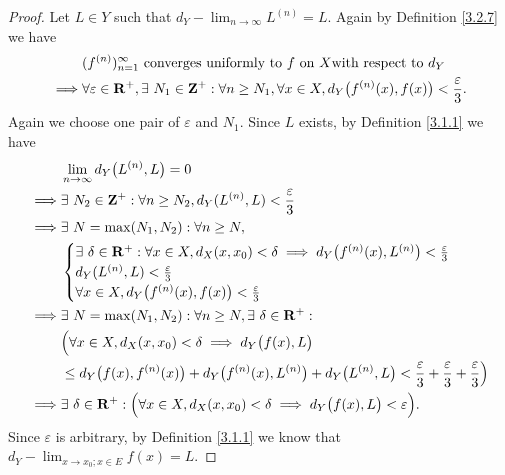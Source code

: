 \begin{proof}
    Let \(L \in Y\) such that \(d_Y - \lim_{n \to \infty} L^{(n)} = L\).
    Again by Definition \ref{3.2.7} we have
    \begin{align*}
                 & (f^{(n)})_{n = 1}^\infty \text{ converges uniformly to } f \text{ on } X \text{with respect to } d_Y                                              \\
        \implies & \forall \varepsilon \in \mathbf{R}^+, \exists\ N_1 \in \mathbf{Z}^+ : \forall n \geq N_1, \forall x \in X, d_Y\big(f^{(n)}(x), f(x)\big) < \frac{\varepsilon}{3}.
    \end{align*}
    Again we choose one pair of \(\varepsilon\) and \(N_1\).
    Since \(L\) exists, by Definition \ref{3.1.1} we have
    \begin{align*}
                 & \lim_{n \to \infty} d_Y\big(L^{(n)}, L\big) = 0                                                                                                                              \\
        \implies & \exists\ N_2 \in \mathbf{Z}^+ : \forall n \geq N_2, d_Y(L^{(n)}, L) < \frac{\varepsilon}{3}                                                                                          \\
        \implies & \exists\ N = \max(N_1, N_2) : \forall n \geq N,                                                                                                                              \\
                 & \begin{cases}
                       \exists\ \delta \in \mathbf{R}^+ : \forall x \in X, d_X(x, x_0) < \delta \implies d_Y\big(f^{(n)}(x), L^{(n)}\big) < \frac{\varepsilon}{3} \\
                       d_Y(L^{(n)}, L) < \frac{\varepsilon}{3}                                                                                            \\
                       \forall x \in X, d_Y\big(f^{(n)}(x), f(x)\big) < \frac{\varepsilon}{3}
                   \end{cases}                                           \\
        \implies & \exists\ N = \max(N_1, N_2) : \forall n \geq N, \exists\ \delta \in \mathbf{R}^+ :                                                                                                   \\
                 & \Big(\forall x \in X, d_X(x, x_0) < \delta \implies d_Y\big(f(x), L\big)                                                                                                     \\
                 & \leq d_Y\big(f(x), f^{(n)}(x)\big) + d_Y\big(f^{(n)}(x), L^{(n)}\big) + d_Y\big(L^{(n)}, L\big) < \frac{\varepsilon}{3} + \frac{\varepsilon}{3} + \frac{\varepsilon}{3}\Big) \\
        \implies & \exists\ \delta \in \mathbf{R}^+ : \Big(\forall x \in X, d_X(x, x_0) < \delta \implies d_Y\big(f(x), L\big) < \varepsilon\Big).
    \end{align*}
    Since \(\varepsilon\) is arbitrary, by Definition \ref{3.1.1} we know that \(d_Y - \lim_{x \to x_0 ; x \in E} f(x) = L\).
\end{proof}


